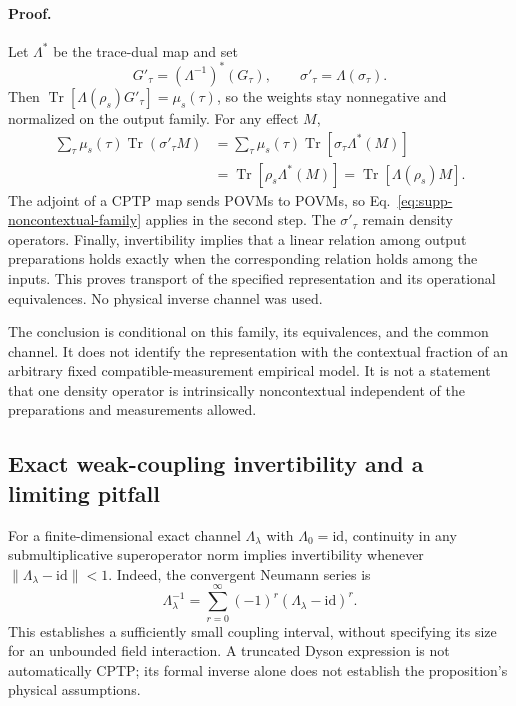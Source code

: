 \documentclass[pdflatex,sn-mathphys-num]{sn-jnl}
\newcommand{\Tr}{\operatorname{Tr}}
\begin{document}
\paragraph{Proof.}
Let $\Lambda^*$ be the trace-dual map and set
\begin{equation}
G'_\tau=(\Lambda^{-1})^*(G_\tau),\qquad
\sigma'_\tau=\Lambda(\sigma_\tau).
\end{equation}
Then $\Tr[\Lambda(\rho_s)G'_\tau]=\mu_s(\tau)$, so the weights stay nonnegative and normalized on the output family. For any effect $M$,
\begin{align}
\sum_\tau\mu_s(\tau)\Tr(\sigma'_\tau M)
&=\sum_\tau\mu_s(\tau)\Tr[\sigma_\tau\Lambda^*(M)]\nonumber\\
&=\Tr[\rho_s\Lambda^*(M)]
=\Tr[\Lambda(\rho_s)M].
\end{align}
The adjoint of a CPTP map sends POVMs to POVMs, so Eq.~\eqref{eq:supp-noncontextual-family} applies in the second step. The $\sigma'_\tau$ remain density operators. Finally, invertibility implies that a linear relation among output preparations holds exactly when the corresponding relation holds among the inputs. This proves transport of the specified representation and its operational equivalences. No physical inverse channel was used.

The conclusion is conditional on this family, its equivalences, and the common channel. It does not identify the representation with the contextual fraction of an arbitrary fixed compatible-measurement empirical model. It is not a statement that one density operator is intrinsically noncontextual independent of the preparations and measurements allowed.

\subsection{Exact weak-coupling invertibility and a limiting pitfall}
For a finite-dimensional exact channel $\Lambda_\lambda$ with $\Lambda_0=\mathrm{id}$, continuity in any submultiplicative superoperator norm implies invertibility whenever $\|\Lambda_\lambda-\mathrm{id}\|<1$. Indeed, the convergent Neumann series is
\begin{equation}
\Lambda_\lambda^{-1}=\sum_{r=0}^{\infty}
(-1)^r(\Lambda_\lambda-\mathrm{id})^r.
\label{eq:supp-neumann-channel-inverse}
\end{equation}
This establishes a sufficiently small coupling interval, without specifying its size for an unbounded field interaction. A truncated Dyson expression is not automatically CPTP; its formal inverse alone does not establish the proposition's physical assumptions.
\end{document}
